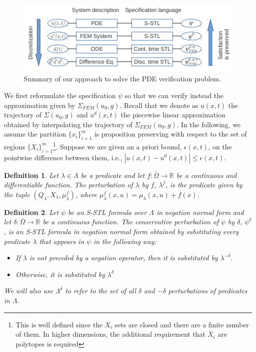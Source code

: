 \documentclass[letterpaper, 10 pt, conference]{ieeeconf/ieeeconf}
\newtheorem{definition}{Definition}
\newcommand*{\R}{\mathbb{R}}
\begin{document}
\begin{figure}[!t]
    \centering 
    \includegraphics[width=0.99\columnwidth]{diagram.png}
    \caption{Summary of our approach to solve the PDE verification problem.}
    \label{fig:diagram}
\end{figure}


We first reformulate the specification $\psi$ so that we can verify instead the
approximation given by $\Sigma_{FEM}(u_0, g)$. Recall that we denote as $u(x,t)$ the
trajectory of $\Sigma(u_0, g)$ and $u^d(x, t)$ the piecewise linear approximation
obtained by interpolating the trajectory of $\Sigma_{FEM}(u_0, g)$. In the following, we
assume the partition $\{x_i\}_{i=1}^m$ is proposition preserving with respect 
to the set of
regions $\{X_i\}_{i = 1}^{m}$\footnote{This is well defined since the $X_i$ sets are
closed and there are a finite number of them. In higher dimensions, the
additional requirement that $X_i$ are polytopes is required}. Suppose we are given
an a priori bound, $\epsilon(x, t)$, on the pointwise difference between them, i.e., 
$|u(x, t) - u^d(x, t)| \leq \epsilon(x, t)$.

\begin{definition}
\label{def:m_perturbation}
    Let $\lambda \in \Lambda$ be a predicate
    and let $f : \bar\Omega \to \R$ be a continuous and differentiable function. The perturbation of
    $\lambda$ by $f$, $\lambda^f$, is the predicate given by the tuple
    $(Q_\lambda, X_\lambda,
    \mu^f_\lambda)$, where $\mu^f_\lambda(x, u) = \mu_\lambda(x, u) + f(x)$.
\end{definition}

\begin{definition}
\label{def:delta_perturbation}
    Let $\psi$ be an S-STL formula over $\Lambda$ in negation normal form 
    and let $\delta : \bar\Omega \to \R$ be a continuous function. The
    conservative perturbation of $\psi$ by $\delta$, $\psi^\delta$, is an S-STL
    formula in negation normal form obtained by substituting every predicate
    $\lambda$ that appears in $\psi$ in the following way:

    \begin{itemize}
        \item If $\lambda$ is not preceded by a negation operator, then it is
            substituted by $\lambda^{-\delta}$.
        \item Otherwise, it is substituted by $\lambda^{\delta}$
    \end{itemize}

    We will also use $\Lambda^{\delta}$ to refer to the set of all $\delta$ and
    $-\delta$
    perturbations of predicates in $\Lambda$.
\end{definition}
\end{document}
